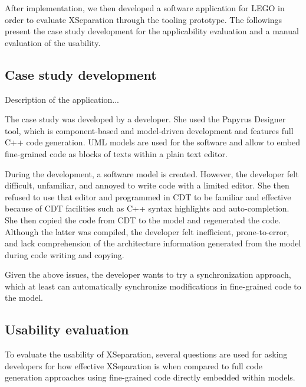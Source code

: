 After implementation, we then developed a software application for LEGO in order to evaluate XSeparation through the tooling prototype.
The followings present the case study development for the applicability evaluation and a manual evaluation of the usability.

\subsection{Case study development}
Description of the application...

The case study was developed by a developer. She used the Papyrus Designer tool, which is component-based and model-driven development and features full C++ code generation.
UML models are used for the software and allow to embed fine-grained code as blocks of texts within a plain text editor.   

During the development, a software model is created.
However, the developer felt difficult, unfamiliar, and annoyed to write code with a limited editor.
She then refused to use that editor and programmed in CDT to be familiar and effective because of CDT facilities such as C++ syntax highlights and auto-completion.
She then copied the code from CDT to the model and regenerated the code.
Although the latter was compiled, the developer felt inefficient, prone-to-error, and lack comprehension of the architecture information generated from the model during code writing and copying.

Given the above issues, the developer wants to try a synchronization approach, which at least can automatically synchronize modifications in fine-grained code to the model.



\subsection{Usability evaluation}
To evaluate the usability of XSeparation, several questions are used for asking developers for how effective XSeparation is when compared to full code generation approaches using fine-grained code directly embedded within models.

